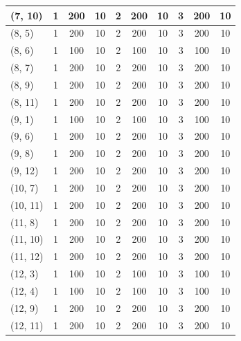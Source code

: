 \documentclass{article}
\begin{document}
\begin{longtable}{||l||c|c|c||c|c|c||c|c|c||}
\hline
(7, 10) & 1 & 200 & 10 & 2 & 200 & 10 & 3 & 200 & 10 \\
\hline
(8, 5) & 1 & 200 & 10 & 2 & 200 & 10 & 3 & 200 & 10 \\
\hline
(8, 6) & 1 & 100 & 10 & 2 & 100 & 10 & 3 & 100 & 10 \\
\hline
(8, 7) & 1 & 200 & 10 & 2 & 200 & 10 & 3 & 200 & 10 \\
\hline
(8, 9) & 1 & 200 & 10 & 2 & 200 & 10 & 3 & 200 & 10 \\
\hline
(8, 11) & 1 & 200 & 10 & 2 & 200 & 10 & 3 & 200 & 10 \\
\hline
(9, 1) & 1 & 100 & 10 & 2 & 100 & 10 & 3 & 100 & 10 \\
\hline
(9, 6) & 1 & 200 & 10 & 2 & 200 & 10 & 3 & 200 & 10 \\
\hline
(9, 8) & 1 & 200 & 10 & 2 & 200 & 10 & 3 & 200 & 10 \\
\hline
(9, 12) & 1 & 200 & 10 & 2 & 200 & 10 & 3 & 200 & 10 \\
\hline
(10, 7) & 1 & 200 & 10 & 2 & 200 & 10 & 3 & 200 & 10 \\
\hline
(10, 11) & 1 & 200 & 10 & 2 & 200 & 10 & 3 & 200 & 10 \\
\hline
(11, 8) & 1 & 200 & 10 & 2 & 200 & 10 & 3 & 200 & 10 \\
\hline
(11, 10) & 1 & 200 & 10 & 2 & 200 & 10 & 3 & 200 & 10 \\
\hline
(11, 12) & 1 & 200 & 10 & 2 & 200 & 10 & 3 & 200 & 10 \\
\hline
(12, 3) & 1 & 100 & 10 & 2 & 100 & 10 & 3 & 100 & 10 \\
\hline
(12, 4) & 1 & 100 & 10 & 2 & 100 & 10 & 3 & 100 & 10 \\
\hline
(12, 9) & 1 & 200 & 10 & 2 & 200 & 10 & 3 & 200 & 10 \\
\hline
(12, 11) & 1 & 200 & 10 & 2 & 200 & 10 & 3 & 200 & 10 \\
\hline
\end{longtable}
\end{document}
